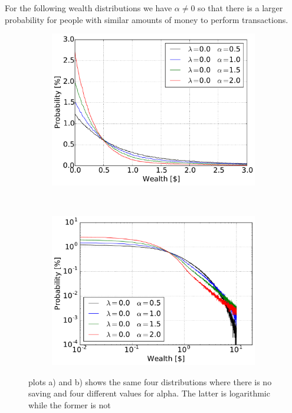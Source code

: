 For the following wealth distributions we have $\alpha\neq 0$ so that there is a larger probability for people with similar amounts of money to perform transactions.
\begin{figure}[H]
    \centering
    \begin{subfigure}{0.5\textwidth}
        \centering
        \includegraphics[width=\linewidth]{result/bilder/5d-00}
        \caption{}
    \end{subfigure}%
    ~ 
    \begin{subfigure}{0.5\textwidth}
        \centering
        \includegraphics[width=\linewidth]{result/bilder/5d-00-loglog}
        \caption{}
    \end{subfigure}
    \caption{plots a) and b) shows the same four distributions where there is no saving and four different values for alpha. The latter is logarithmic while the former is not}
    \label{fig:5b}
\end{figure}

